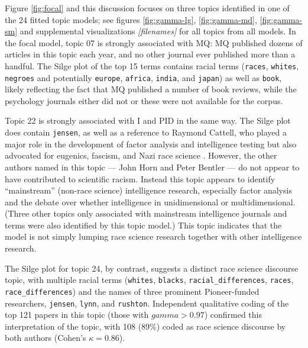 \documentclass[12pt]{article}
\begin{document}
Figure \ref{fig:focal} and this discussion focuses on three topics identified in one of the 24 fitted topic models; see figures \ref{fig:gamma-lg}, \ref{fig:gamma-md}, \ref{fig:gamma-sm} and supplemental visualizations \emph{{[}filenames{]}} for all topics from all models. In the focal model, topic 07 is strongly associated with MQ: MQ published dozens of articles in this topic each year, and no other journal ever published more than a handful. The Silge plot of the top 15 terms \cite{SilgeTopicModeling2017} contains racial terms (\texttt{races}, \texttt{whites}, \texttt{negroes} and potentially \texttt{europe}, \texttt{africa}, \texttt{india}, and \texttt{japan}) as well as \texttt{book}, likely reflecting the fact that MQ published a number of book reviews, while the psychology journals either did not or these were not available for the corpus.

Topic 22 is strongly associated with I and PID in the same way. The Silge plot does contain \texttt{jensen}, as well as a reference to Raymond Cattell, who played a major role in the development of factor analysis and intelligence testing but also advocated for eugenics, fascism, and Nazi race science \cite{MehlerBeyondismRaymondCattell1997}. However, the other authors named in this topic --- John Horn and Peter Bentler --- do not appear to have contributed to scientific racism. Instead this topic appears to identify ``mainstream'' (non-race science) intelligence research, especially factor analysis and the debate over whether intelligence in unidimensional or multidimensional. (Three other topics only associated with mainstream intelligence journals and terms were also identified by this topic model.) This topic indicates that the model is not simply lumping race science research together with other intelligence research.

The Silge plot for topic 24, by contrast, suggests a distinct race science discourse topic, with multiple racial terms (\texttt{whites}, \texttt{blacks}, \texttt{racial\_differences}, \texttt{races}, \texttt{race\_differences}) and the names of three prominent Pioneer-funded researchers, \texttt{jensen}, \texttt{lynn}, and \texttt{rushton}. Independent qualitative coding of the top 121 papers in this topic (those with \(gamma > 0.97\)) confirmed this interpretation of the topic, with 108 (89\%) coded as race science discourse by both authors (Cohen's \(\kappa = 0.86\)).
\end{document}
